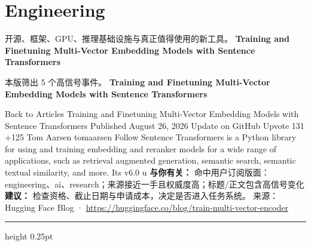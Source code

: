 \documentclass[10.5pt]{ctexart}
\begin{document}
\section*{Engineering}
{\color{ormuted} 开源、框架、GPU、推理基础设施与真正值得使用的新工具。}
\vspace{2mm}
{\LARGE\bfseries Training and Finetuning Multi-Vector Embedding Models with Sentence Transformers}\par
\vspace{1mm}
{\color{ormuted} 本版筛出 5 个高信号事件。}
\vspace{3mm}
{\Large\bfseries Training and Finetuning Multi-Vector Embedding Models with Sentence Transformers}\par
Back to Articles Training and Finetuning Multi-Vector Embedding Models with Sentence Transformers Published August 26, 2026 Update on GitHub Upvote 131 +125 Tom Aarsen tomaarsen Follow Sentence Transformers is a Python library for using and training embedding and reranker models for a wide range of applications, such as retrieval augmented generation, semantic search, semantic textual similarity, and more. Its v6.0 u
\textbf{与你有关：} 命中用户订阅版面：engineering、ai、research；来源接近一手且权威度高；标题/正文包含高信号变化
\textbf{建议：} 检查资格、截止日期与申请成本，决定是否进入任务系统。
{\footnotesize\color{ormuted} 来源：Hugging Face Blog · \url{https://huggingface.co/blog/train-multi-vector-encoder}}
\vspace{4mm}
\hrule height 0.25pt
\vspace{3mm}
\end{document}
